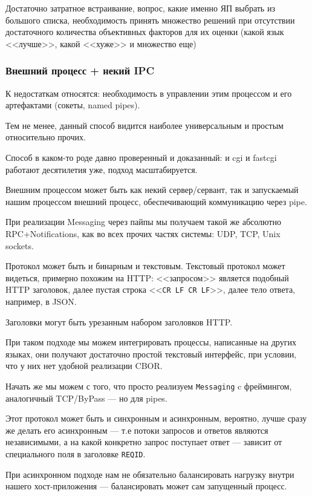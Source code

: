 Достаточно затратное встраивание, вопрос, какие именно ЯП выбрать из
большого списка, необходимость принять множество решений при
отсутствии достаточного количества объективных факторов для их оценки
(какой язык <<лучше>>, какой <<хуже>> и множество еще)

\subsubsection{Внешний процесс + некий IPC}

К недостаткам относятся: необходимость в управлении этим процессом и
его артефактами (сокеты, named pipes).


Тем не менее, данный способ видится наиболее универсальным и простым
относительно прочих.

Способ в каком-то роде давно проверенный и доказанный: и cgi и fastcgi
работают десятилетия уже, подход масштабируется.

Внешним процессом может быть как некий сервер/сервант, так и
запускаемый нашим процессом внешний процесс, обеспечивающий
коммуникацию через pipe.

При реализации Messaging через пайпы мы получаем такой же абсолютно
RPC+Notifications, как во всех прочих частях системы: UDP, TCP, Unix
sockets.

Протокол может быть и бинарным и текстовым. Текстовый протокол может
видеться, примерно похожим на HTTP:  <<запросом>> является подобный
HTTP заголовок, далее пустая строка <<\texttt{CR LF CR LF}>>, далее
тело ответа, например, в JSON.

Заголовки могут быть урезанным набором заголовков HTTP.

При таком подходе мы можем интегрировать процессы, написанные на
других языках, они получают достаточно простой текстовый интерфейс,
при условии, что у них нет удобной реализации CBOR.

Начать же мы можем с того, что просто реализуем \texttt{Messaging} c
фреймингом, аналогичный TCP/ByPass --- но для pipes.

Этот протокол может быть и синхронным и асинхронным, вероятно, лучше
сразу же делать его асинхронным --- т.е потоки запросов и ответов
являются независимыми, а на какой конкретно запрос поступает ответ ---
зависит от специального поля в заголовке \texttt{REQID}.

При асинхронном подходе нам не обязательно балансировать нагрузку
внутри нашего хост-приложения --- балансировать может сам запущенный
процесс.

